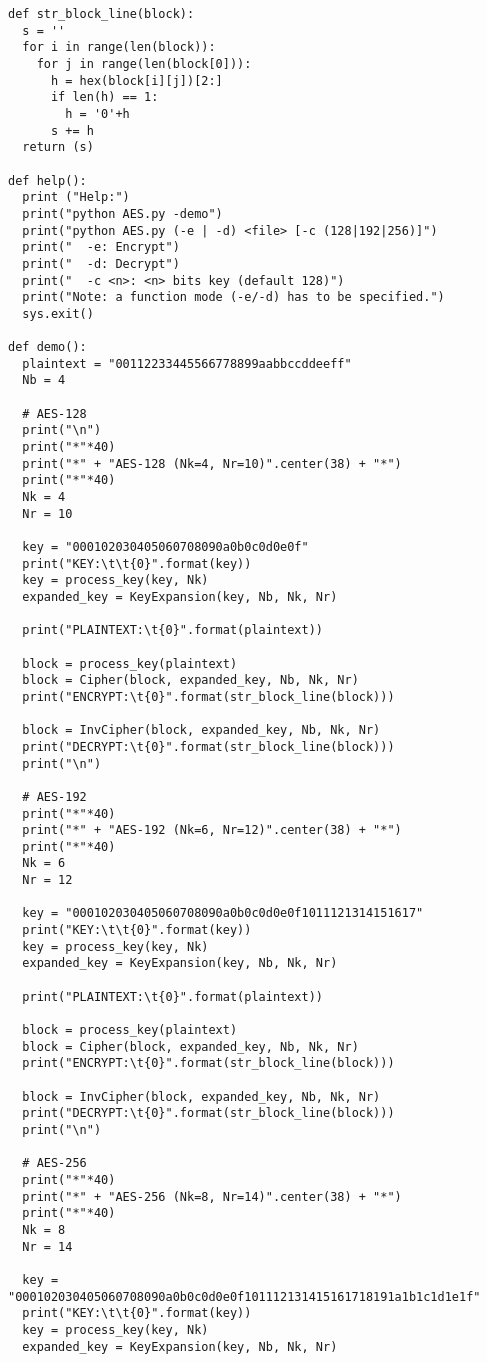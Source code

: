 \begin{lstlisting}
def str_block_line(block):
  s = ''
  for i in range(len(block)):
    for j in range(len(block[0])):
      h = hex(block[i][j])[2:]
      if len(h) == 1:
        h = '0'+h
      s += h
  return (s)

def help():
  print ("Help:")
  print("python AES.py -demo")
  print("python AES.py (-e | -d) <file> [-c (128|192|256)]")
  print("  -e: Encrypt")
  print("  -d: Decrypt")
  print("  -c <n>: <n> bits key (default 128)")
  print("Note: a function mode (-e/-d) has to be specified.")
  sys.exit()

def demo():
  plaintext = "00112233445566778899aabbccddeeff"
  Nb = 4

  # AES-128
  print("\n")
  print("*"*40)
  print("*" + "AES-128 (Nk=4, Nr=10)".center(38) + "*")
  print("*"*40)
  Nk = 4
  Nr = 10

  key = "000102030405060708090a0b0c0d0e0f"
  print("KEY:\t\t{0}".format(key))
  key = process_key(key, Nk)
  expanded_key = KeyExpansion(key, Nb, Nk, Nr)

  print("PLAINTEXT:\t{0}".format(plaintext))

  block = process_key(plaintext)
  block = Cipher(block, expanded_key, Nb, Nk, Nr)
  print("ENCRYPT:\t{0}".format(str_block_line(block)))

  block = InvCipher(block, expanded_key, Nb, Nk, Nr)
  print("DECRYPT:\t{0}".format(str_block_line(block)))
  print("\n")

  # AES-192
  print("*"*40)
  print("*" + "AES-192 (Nk=6, Nr=12)".center(38) + "*")
  print("*"*40)
  Nk = 6
  Nr = 12

  key = "000102030405060708090a0b0c0d0e0f1011121314151617"
  print("KEY:\t\t{0}".format(key))
  key = process_key(key, Nk)
  expanded_key = KeyExpansion(key, Nb, Nk, Nr)

  print("PLAINTEXT:\t{0}".format(plaintext))

  block = process_key(plaintext)
  block = Cipher(block, expanded_key, Nb, Nk, Nr)
  print("ENCRYPT:\t{0}".format(str_block_line(block)))

  block = InvCipher(block, expanded_key, Nb, Nk, Nr)
  print("DECRYPT:\t{0}".format(str_block_line(block)))
  print("\n")

  # AES-256
  print("*"*40)
  print("*" + "AES-256 (Nk=8, Nr=14)".center(38) + "*")
  print("*"*40)
  Nk = 8
  Nr = 14

  key = "000102030405060708090a0b0c0d0e0f101112131415161718191a1b1c1d1e1f"
  print("KEY:\t\t{0}".format(key))
  key = process_key(key, Nk)
  expanded_key = KeyExpansion(key, Nb, Nk, Nr)


\end{lstlisting}
